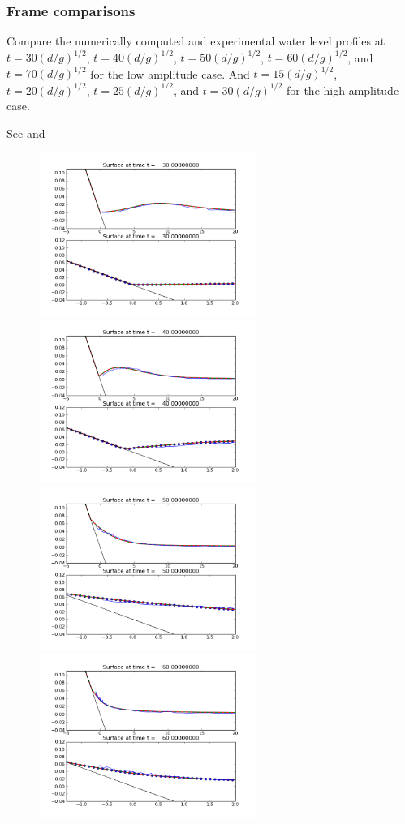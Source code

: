 \subsubsection{Frame comparisons}
Compare the numerically computed and experimental water level profiles at $t = 30(d/g)^{1/2}$, $t = 40(d/g)^{1/2}$, $t = 50(d/g)^{1/2}$, $t = 60(d/g)^{1/2}$, and $t = 70(d/g)^{1/2}$ for the low amplitude case. And $t = 15(d/g)^{1/2}$, $t = 20(d/g)^{1/2}$, $t = 25(d/g)^{1/2}$, and $t = 30(d/g)^{1/2}$ for the high amplitude case.

See  and 
\begin{figure}[ht]
\hfil\includegraphics[width=2.8in]{bp4/lab-185/frame0001fig2.png}\hfil
\hfil\includegraphics[width=2.8in]{bp4/lab-185/frame0002fig2.png}\hfil
\vskip 5pt
\hfil\includegraphics[width=2.8in]{bp4/lab-185/frame0003fig2.png}\hfil
\hfil\includegraphics[width=2.8in]{bp4/lab-185/frame0004fig2.png}\hfil

\end{figure}
